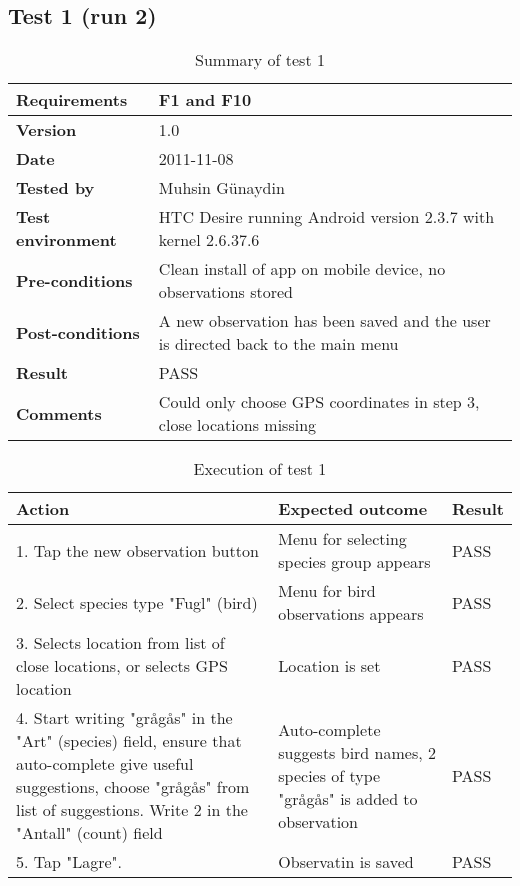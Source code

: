 \newpage
\subsection*{Test 1 (run 2)}

	\begin{table}[htb]
		\centering
		\begin{tabular}{|p{3.5cm}|p{7.0cm}|} \hline
			\textbf{Requirements} & F1 and F10 \\ \hline
			\textbf{Version} & 1.0 \\ \hline
			\textbf{Date} & 2011-11-08 \\ \hline
			\textbf{Tested by} & Muhsin Günaydin \\ \hline
			\textbf{Test environment} & HTC Desire running Android version 2.3.7 with kernel 2.6.37.6 \\ \hline
			\textbf{Pre-conditions} & Clean install of app on mobile device, no observations stored \\ \hline
			\textbf{Post-conditions} & A new observation has been saved and the user is directed back to the main menu \\ \hline
			\textbf{Result} & PASS \\ \hline
			\textbf{Comments} & Could only choose GPS coordinates in step 3, close locations missing \\ \hline
		\end{tabular}
		\caption{Summary of test 1}
	\end{table}

	\begin{table}[htb]
		\centering
		\begin{tabular}{|p{5.0cm}|p{5.0cm}|p{1cm}|}
			\hline \textbf{Action} & \textbf{Expected outcome} & \textbf{Result} \\ \hline
			1. Tap the new observation button & Menu for selecting species group appears & PASS \\ \hline
			2. Select species type "Fugl" (bird) & Menu for bird observations appears & PASS \\ \hline
			3. Selects location from list of close locations, or selects GPS location & Location is set & PASS \\ \hline
			4. Start writing "grågås" in the "Art" (species) field, ensure that
			auto-complete give useful suggestions, choose "grågås" from list of
			suggestions. Write 2 in the "Antall" (count) field & Auto-complete
			suggests bird names, 2 species of type "grågås" is added to observation
			& PASS \\ \hline 
			5. Tap "Lagre". & Observatin is saved & PASS \\ \hline
		\end{tabular}
		\caption{Execution of test 1}
	\end{table}

